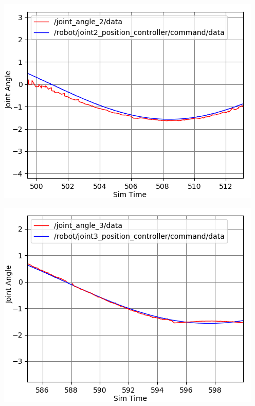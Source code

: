 \documentclass[11pt]{article}
\begin{document}
\begin{center}
\begin{minipage}{0.33\linewidth}
\includegraphics[width=\linewidth]{fig_with_axisname/2.1-joint2.png}
\end{minipage}%
\hfill
\begin{minipage}{0.33\linewidth}
\includegraphics[width=\linewidth]{fig_with_axisname/2.1-joint3.png}
\end{minipage}
\hfill
\begin{minipage}{0.33\linewidth}

\end{minipage}
\end{center}
\end{document}
